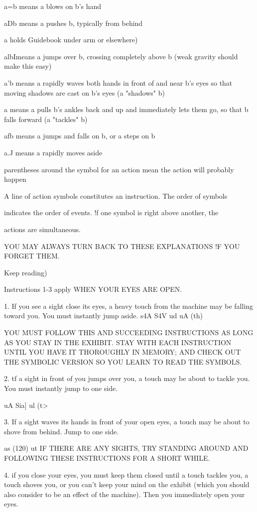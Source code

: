 \documentclass[10pt,twoside]{memoir}
\begin{document}
\begin{enumerate}
{\begin{enumerate}
\begin{sysrules}
\begin{sysrules}
\begin{sysrules}
\begin{sysrules}
{\begin{enumerate}
{{{{a=b means a blows on b's hand 

aDb means a pushes b, typically from behind 
{a holds Guidebook under arm or elsewhere) 

albImeans a jumps over b, crossing completely above b (weak gravity 
should make this easy) 

a'b means a rapidly waves both hands in front of and near b's eyes so that 
moving shadows are cast on b's eyes (a "shadows" b) 

a means a pulls b's ankles back and up and immediately lets them go, so 
that b falls forward (a "tackles" b) 

afb means a jumps and falls on b, or a steps on b 

a.J means a rapidly moves aside 

{} parentheses around the symbol for an action mean the action will 
probably happen 

A line of action symbols constitutes an instruction. The order of symbols 

indicates the order of events. !f one symbol is right above another, the 

actions are simultaneous. 


YOU MAY ALWAYS TURN BACK TO THESE EXPLANATIONS !F 
YOU FORGET THEM. 


{Keep reading) 


Instructions 1-3 apply WHEN YOUR EYES ARE OPEN. 


1. If you see a sight close its eyes, a heavy touch from the machine 
may be falling toward you. You must instantly jump aside. s4A S4V ud 
uA (th) 


YOU MUST FOLLOW THIS AND SUCCEEDING INSTRUCTIONS AS 
LONG AS YOU STAY IN THE EXHIBIT. STAY WITH EACH 
INSTRUCTION UNTIL YOU HAVE IT THOROUGHLY IN MEMORY; 
AND CHECK OUT THE SYMBOLIC VERSION SO YOU LEARN TO 
READ THE SYMBOLS. 


2. tf a sight in front of you jumps over you, a touch may be about to 
tackle you. You must instantly jump to one side. 


uA Sia] ul 
(t> 


3. If a sight waves its hands in front of your open eyes, a touch may 
be about to shove from behind. Jump to one side. 


as (120) ut 
IF THERE ARE ANY SIGHTS, TRY STANDING AROUND AND 
FOLLOWING THESE INSTRUCTIONS FOR A SHORT WHILE. 


4. if you close your eyes, you must keep them closed until a touch 
tackles you, a touch shoves you, or you can't keep your mind on the exhibit 
(which you should also consider to be an effect of the machine). Then you 
immediately open your eyes. 


}}}}}}
\end{enumerate}}
\end{sysrules}
\end{sysrules}
\end{sysrules}
\end{sysrules}
\end{enumerate}}
\end{enumerate}
\end{document}
